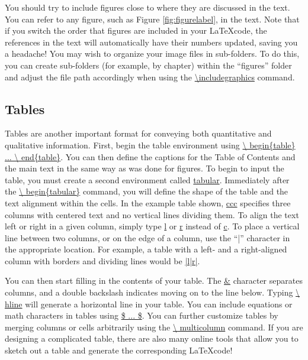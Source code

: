 You should try to include figures close to where they are discussed in the text. You can refer to any figure, such as Figure \ref{fig:figurelabel}, in the text. Note that if you switch the order that figures are included in your \LaTeX code, the references in the text will automatically have their numbers updated, saving you a headache! You may wish to organize your image files in sub-folders. To do this, you can create sub-folders (for example, by chapter) within the ``figures'' folder and adjust the file path accordingly when using the \url{\includegraphics} command.


\subsection{Tables}

Tables are another important format for conveying both quantitative and qualitative information. First, begin the table environment using \url{\ begin{table} ... \ end{table}}. You can then define the captions for the Table of Contents and the main text in the same way as was done for figures. To begin to input the table, you must create a second environment called \url{tabular}. Immediately after the \url{\ begin{tabular}} command, you will define the shape of the table and the text alignment within the cells. In the example table shown, \url{ccc} specifies three columns with centered text and no vertical lines dividing them. To align the text left or right in a given column, simply type \url{l} or \url{r} instead of \url{c}. To place a vertical line between two columns, or on the edge of a column, use the ``|'' character in the appropriate location. For example, a table with a left- and a right-aligned column with borders and dividing lines would be \url{|l|r|}. 

You can then start filling in the contents of your table. The \url{&} character separates columns, and a double backslash indicates moving on to the line below. Typing \url{\ hline} will generate a horizontal line in your table. You can include equations or math characters in tables using \url{$ ... $}. You can further customize tables by merging columns or cells arbitrarily using the \url{\ multicolumn} command. If you are designing a complicated table, there are also many online tools that allow you to sketch out a table and generate the corresponding \LaTeX code!


